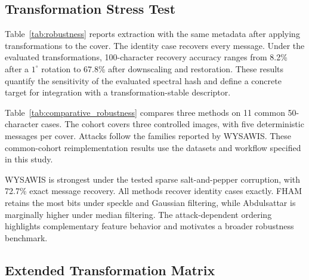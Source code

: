\documentclass[preprint,12pt]{elsarticle}
\theoremstyle{plain}
\begin{document}
\subsection{Transformation Stress Test}

Table~\ref{tab:robustness} reports extraction with
the same metadata after applying transformations to the cover. The identity
case recovers every message. Under the evaluated transformations,
100-character recovery accuracy ranges from 8.2\% after a
$1^\circ$ rotation to 67.8\% after downscaling and restoration. These results
quantify the sensitivity of the evaluated spectral hash and define a concrete
target for integration with a transformation-stable descriptor.

\begin{table}[!t]
\centering
\caption{Recovery After Cover Transformations}
\label{tab:robustness}

\end{table}

Table~\ref{tab:comparative_robustness} compares three methods on 11 common
50-character cases. The cohort covers three controlled images, with five
deterministic messages per cover. Attacks follow the families reported by
WYSAWIS. These common-cohort reimplementation results use the datasets and
workflow specified in this study.

\begin{table}[!t]
\centering
\caption{Common-Cohort Bit Accuracy for the Three Mapping Methods}
\label{tab:comparative_robustness}
\resizebox{\linewidth}{!}{}
\end{table}

WYSAWIS is strongest under the tested sparse salt-and-pepper corruption, with
72.7\% exact message recovery. All methods recover identity cases exactly.
FHAM retains the most bits
under speckle and Gaussian filtering, while Abdulsattar is marginally higher
under median filtering. The attack-dependent ordering highlights complementary
feature behavior and motivates a broader robustness benchmark.

\subsection{Extended Transformation Matrix}
\end{document}

